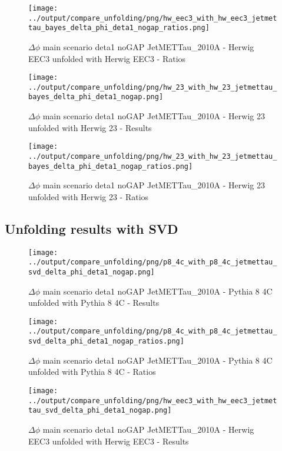 \documentclass[11pt]{book}
\begin{document}
\begin{figure}[ht]
\centering
\texttt{[image: ../output/compare\_unfolding/png/hw\_eec3\_with\_hw\_eec3\_jetmettau\_bayes\_delta\_phi\_deta1\_nogap\_ratios.png]}
\caption{$\Delta\phi$ main scenario deta1 noGAP JetMETTau\_2010A - Herwig EEC3 unfolded with Herwig EEC3 - Ratios}
\label{hw_eec3_hw_eec3_jetmettau_bayes_delta_phi_deta1_nogap_b}
\end{figure}

\begin{figure}[ht]
\centering
\texttt{[image: ../output/compare\_unfolding/png/hw\_23\_with\_hw\_23\_jetmettau\_bayes\_delta\_phi\_deta1\_nogap.png]}
\caption{$\Delta\phi$ main scenario deta1 noGAP JetMETTau\_2010A - Herwig 23 unfolded with Herwig 23 - Results}
\label{hw_23_hw_23_jetmettau_bayes_delta_phi_deta1_nogap_a}
\end{figure}

\begin{figure}[ht]
\centering
\texttt{[image: ../output/compare\_unfolding/png/hw\_23\_with\_hw\_23\_jetmettau\_bayes\_delta\_phi\_deta1\_nogap\_ratios.png]}
\caption{$\Delta\phi$ main scenario deta1 noGAP JetMETTau\_2010A - Herwig 23 unfolded with Herwig 23 - Ratios}
\label{hw_23_hw_23_jetmettau_bayes_delta_phi_deta1_nogap_b}
\end{figure}

\clearpage
\subsection{Unfolding results with SVD}

\begin{figure}[ht]
\centering
\texttt{[image: ../output/compare\_unfolding/png/p8\_4c\_with\_p8\_4c\_jetmettau\_svd\_delta\_phi\_deta1\_nogap.png]}
\caption{$\Delta\phi$ main scenario deta1 noGAP JetMETTau\_2010A - Pythia 8 4C unfolded with Pythia 8 4C - Results}
\label{p8_p8_jetmettau_svd_delta_phi_deta1_nogap_a}
\end{figure}

\begin{figure}[ht]
\centering
\texttt{[image: ../output/compare\_unfolding/png/p8\_4c\_with\_p8\_4c\_jetmettau\_svd\_delta\_phi\_deta1\_nogap\_ratios.png]}
\caption{$\Delta\phi$ main scenario deta1 noGAP JetMETTau\_2010A - Pythia 8 4C unfolded with Pythia 8 4C - Ratios}
\label{p8_p8_jetmettau_svd_delta_phi_deta1_nogap_b}
\end{figure}

\begin{figure}[ht]
\centering
\texttt{[image: ../output/compare\_unfolding/png/hw\_eec3\_with\_hw\_eec3\_jetmettau\_svd\_delta\_phi\_deta1\_nogap.png]}
\caption{$\Delta\phi$ main scenario deta1 noGAP JetMETTau\_2010A - Herwig EEC3 unfolded with Herwig EEC3 - Results}
\label{hw_eec3_hw_eec3_jetmettau_svd_delta_phi_deta1_nogap_a}
\end{figure}
\end{document}
